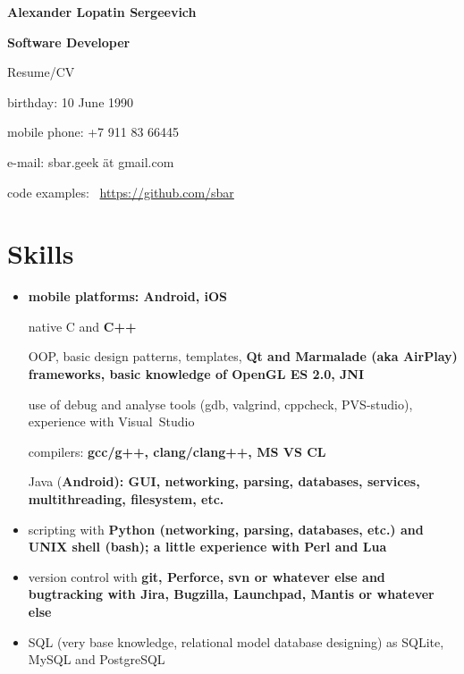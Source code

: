 \begin{center}
\fontsize{16pt}{12pt}\selectfont
\bfseries Alexander Lopatin Sergeevich\mdseries

\fontsize{12pt}{12pt}\selectfont
\bfseries Software Developer\mdseries

Resume/CV
\end{center}
{
\fontsize{11pt}{8pt}\selectfont
\begin{flushright}
\item birthday: 10 June 1990
\item mobile phone: +7 911 83 66445
\item e-mail: sbar.geek ät gmail.com
\item code examples: \
\href{https://github.com/sbar?tab=repositories}{https://github.com/sbar}
\end{flushright}
}

\fontsize{12pt}{14pt}\selectfont
\section{Skills}
\begin{itemize}

\item \bfseries mobile platforms: \mdseries Android, iOS

\subitem native C and \bfseries C++\mdseries

\subsubitem OOP, basic design patterns, templates,
\bfseries Qt \mdseries and
\bfseries Marmalade \mdseries (aka \bfseries AirPlay\mdseries) frameworks,
basic knowledge of OpenGL ES 2.0, \bfseries JNI\mdseries

\subsubitem use of debug and analyse tools (gdb, valgrind, cppcheck, PVS-studio),
experience with Visual~Studio

\subsubitem compilers: \bfseries gcc/g++\mdseries, clang/clang++, MS VS CL

\subitem Java (\bfseries Android\mdseries): GUI, networking, parsing, databases, services, multithreading, filesystem, etc.

\item scripting with
\bfseries Python \mdseries (networking, parsing, databases, etc.)
and
\bfseries UNIX shell (bash)\mdseries;
a little experience with
\bfseries Perl \mdseries and \bfseries Lua\mdseries

\item version control with \bfseries git\mdseries, Perforce, svn or whatever else
and bugtracking with Jira, Bugzilla, Launchpad, Mantis or whatever else

\item SQL (very base knowledge, relational model database designing)
as SQLite, MySQL and PostgreSQL

\end{itemize}

